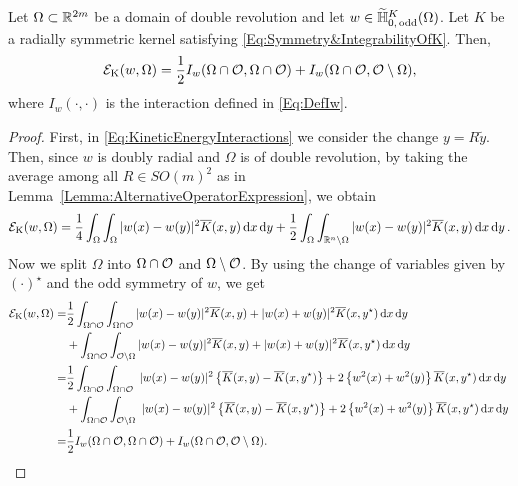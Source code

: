 \begin{lemma}
	\label{Lemma:ShortExpressionEnergy}
Let $\Omega\subset \mathbb{R}^{2m}$ be a domain of double revolution and let $w\in \widetilde{\mathbb{H}}^K_{0,\, \mathrm{odd}}(\Omega)$. Let $K$ be a radially symmetric kernel satisfying \eqref{Eq:Symmetry&IntegrabilityOfK}. Then, 
\begin{align*}
\label{Eq:EnergyOddInOcal2}
\mathcal{E}_\mathrm{K}(w, \Omega) = \frac{1}{2} I_w(\Omega\cap\mathcal{O},\Omega\cap\mathcal{O}) + I_w(\Omega\cap\mathcal{O},\mathcal{O}\setminus\Omega),
\end{align*}
where $I_w(\cdot, \cdot)$ is the interaction defined in \eqref{Eq:DefIw}.
\end{lemma}

\begin{proof}
	
	First, in \eqref{Eq:KineticEnergyInteractions} we consider the change $ y = R\tilde{y}$. Then, since $w$ is doubly radial and $\Omega$ is of double revolution, by taking the average among all $R\in SO(m)^2$ as in Lemma~\ref{Lemma:AlternativeOperatorExpression}, we obtain
	$$
	\mathcal{E}_\mathrm{K}(w, \Omega) = \frac{1}{4} \int_{\Omega} \int_{\Omega} |w(x)-w(y)|^2 \overline{K}(x,y) \,\mathrm{d} x \,\mathrm{d} y + \frac{1}{2} \int_{\Omega} \int_{\mathbb{R}^n \setminus \Omega} |w(x)-w(y)|^2 \overline{K}(x,y) \,\mathrm{d} x \,\mathrm{d} y\,.
	$$
	Now we split $\Omega$ into $\Omega \cap \mathcal{O}$ and $\Omega \setminus \mathcal{O}$. By using the change of variables given by $(\cdot)^\star$ and the odd symmetry of $w$, we get	
	\begin{align*}
\ecal_\mathrm{K}(w, \Omega) =  & \frac{1}{2} \int_{\Omega\cap \ocal} \int_{\Omega \cap \ocal} |w(x)-w(y)|^2 \overline{K}(x,y) + |w(x)+w(y)|^2 \overline{K}(x,y^\star) \d x \d y  \\
& + \int_{\Omega\cap \ocal} \int_{\ocal \setminus \Omega} |w(x)-w(y)|^2 \overline{K}(x,y) + |w(x)+w(y)|^2 \overline{K}(x,y^\star) \d x \d y  \\
= & \frac{1}{2} \int_{\Omega\cap \ocal} \int_{\Omega \cap \ocal}  \ |w(x)-w(y)|^2 \left\{ \overline{K}(x,y) - \overline{K}(x,y^\star) \right\}  +2 \left\{w^2(x)+w^2(y)\right\} \overline{K}(x,y^\star) \d x \d y\,\\
&+ \int_{\Omega\cap \ocal} \int_{\ocal \setminus \Omega}  \ |w(x)-w(y)|^2 \left\{ \overline{K}(x,y) - \overline{K}(x,y^\star) \right\}  +2 \left\{w^2(x)+w^2(y)\right\} \overline{K}(x,y^\star) \d x \d y\,\\
= & \frac{1}{2} I_w(\Omega\cap\ocal,\Omega\cap\ocal) + I_w(\Omega\cap\ocal,\ocal\setminus\Omega).
\end{align*}
\end{proof}

